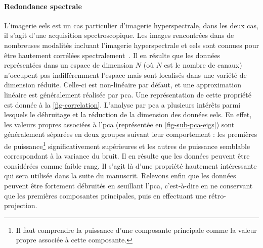     \paragraph*{Redondance spectrale} L'imagerie \gls{eels} est un cas particulier d'imagerie hyperspectrale, dans les deux cas, il s'agit d'une acquisition spectroscopique. Les images rencontrées dans de nombreuses modalités incluant l'imagerie hyperspectrale et \gls{eels} sont connues pour être hautement corrélées spectralement~\cite{dobigeon_linear_2016, bioucas2012hyperspectral, dobigeon2012spectral}. Il en résulte que les données représentées dans un espace de dimension $N$ (où $N$ est le nombre de canaux) n'occupent pas indifféremment l'espace mais sont localisés dans une variété de dimension réduite. Celle-ci est non-linéaire par défaut, et une approximation linéaire est généralement réalisée par \gls{pca}. Une représentation de cette propriété est donnée à la \cref{fig-correlation}. L'analyse par \gls{pca} a plusieurs intérêts parmi lesquels le débruitage  et la réduction de la dimension des données \gls{eels}. En effet, les valeurs propres associées à l'\gls{pca} (représentée en \cref{fig-sub-pca-eigs}) sont généralement séparées en deux groupes suivant leur comportement : les premières de puissance\footnote{Il faut comprendre la puissance d'une composante principale comme la valeur propre associée à cette composante.} significativement supérieures et les autres de puissance semblable correspondant à la variance du bruit. Il en résulte que les données peuvent être considérées comme faible rang. Il s'agit là d'une propriété hautement intéressante qui sera utilisée dans la suite du manuscrit. Relevons enfin que les données peuvent être fortement débruités en seuillant l'\gls{pca}, c'est-à-dire en ne conservant que les premières composantes principales, puis en effectuant une rétro-projection.

